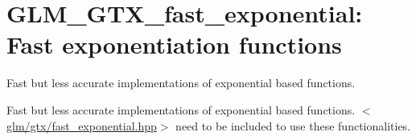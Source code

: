 \hypertarget{group__gtx__fast__exponential}{\section{\-G\-L\-M\-\_\-\-G\-T\-X\-\_\-fast\-\_\-exponential\-: \-Fast exponentiation functions}
\label{group__gtx__fast__exponential}
}


\-Fast but less accurate implementations of exponential based functions.  


\-Fast but less accurate implementations of exponential based functions. $<$\hyperlink{fast__exponential_8hpp}{glm/gtx/fast\-\_\-exponential.\-hpp}$>$ need to be included to use these functionalities. 